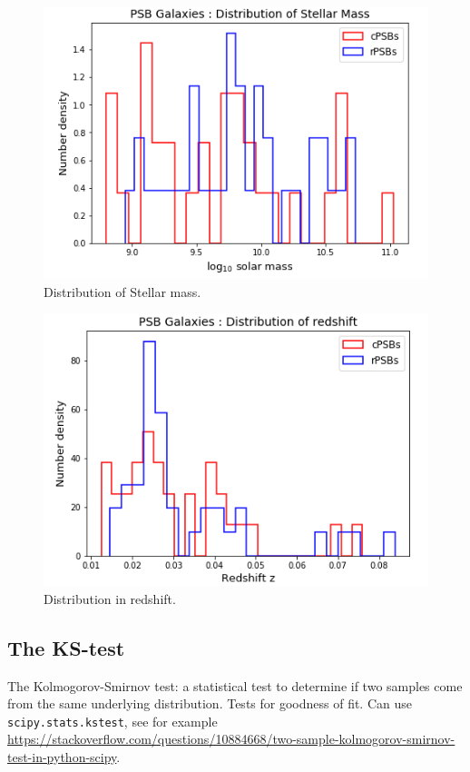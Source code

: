 \begin{figure}
    \centering
    \includegraphics[width=\columnwidth]{images/JupyterPlots/Stellar-mass-distribution.png}
    \caption{Distribution of Stellar mass.}
    \label{fig:stellar-mass-plot}
\end{figure}

\begin{figure}
    \centering
    \includegraphics[width=\columnwidth]{images/JupyterPlots/Redshift-distribution.png}
    \caption{Distribution in redshift.}
    \label{fig:redshift-plot}
\end{figure}

\subsection{The KS-test}
The Kolmogorov-Smirnov test: a statistical test to determine if two samples come from the same underlying distribution. Tests for goodness of fit. Can use \texttt{scipy.stats.kstest}, see for example \url{https://stackoverflow.com/questions/10884668/two-sample-kolmogorov-smirnov-test-in-python-scipy}.

